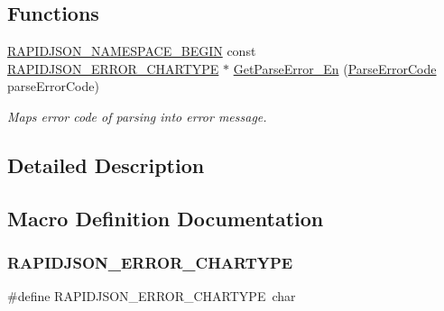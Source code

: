 \subsection*{Functions}
\begin{DoxyCompactItemize}
\item 
\hyperlink{group___r_a_p_i_d_j_s_o_n___c_o_n_f_i_g_gad3806c8251fdc7da9618b7e922674ffc}{R\+A\+P\+I\+D\+J\+S\+O\+N\+\_\+\+N\+A\+M\+E\+S\+P\+A\+C\+E\+\_\+\+B\+E\+G\+IN} const \hyperlink{group___r_a_p_i_d_j_s_o_n___e_r_r_o_r_s_ga7e4636fd48d0148f102b8a13f0539d8c}{R\+A\+P\+I\+D\+J\+S\+O\+N\+\_\+\+E\+R\+R\+O\+R\+\_\+\+C\+H\+A\+R\+T\+Y\+PE} $\ast$ \hyperlink{group___r_a_p_i_d_j_s_o_n___e_r_r_o_r_s_ga755b523205f46c980c80d12e230a3abd}{Get\+Parse\+Error\+\_\+\+En} (\hyperlink{group___r_a_p_i_d_j_s_o_n___e_r_r_o_r_s_ga8d4b32dfc45840bca189ade2bbcb6ba7}{Parse\+Error\+Code} parse\+Error\+Code)
\begin{DoxyCompactList}\small\item\em Maps error code of parsing into error message. \end{DoxyCompactList}\end{DoxyCompactItemize}


\subsection{Detailed Description}


\subsection{Macro Definition Documentation}
\mbox{\label{group___r_a_p_i_d_j_s_o_n___e_r_r_o_r_s_ga7e4636fd48d0148f102b8a13f0539d8c}} 
\subsubsection{\texorpdfstring{R\+A\+P\+I\+D\+J\+S\+O\+N\+\_\+\+E\+R\+R\+O\+R\+\_\+\+C\+H\+A\+R\+T\+Y\+PE}{RAPIDJSON\_ERROR\_CHARTYPE}}
{\footnotesize\ttfamily \#define R\+A\+P\+I\+D\+J\+S\+O\+N\+\_\+\+E\+R\+R\+O\+R\+\_\+\+C\+H\+A\+R\+T\+Y\+PE~char}



